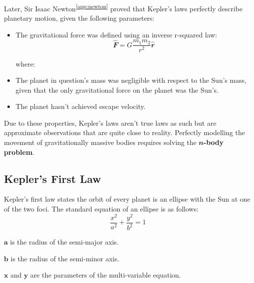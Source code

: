 \documentclass[12pt]{article}
\newcommand{\sref}[1]{\textsuperscript{\ref{#1}}}
\begin{document}
\begin{spacing}{1.25}
\par {
    Later, Sir Isaac Newton\sref{app:newton} proved that Kepler’s laws perfectly describe planetary motion, given the following parameters:
    \begin{itemize}
        \item The gravitational force was defined using an inverse r-squared law:
        \begin{equation}
            \mathbfit{\hat{F}} = G\frac{m_1m_2}{r^2} \mathbfit{\hat{r}}
        \end{equation}

        where:
        
        \item The planet in question's mass was negligible with respect to the Sun's mass, given that the only gravitational force on the planet was the Sun's.
        
        \item The planet hasn't achieved escape velocity.
    \end{itemize}
    \noindent Due to these properties, Kepler's laws aren't true laws as such but are approximate observations that are quite close to reality. Perfectly modelling the movement of gravitationally massive bodies requires solving the \(\mathbfit{n}\)\textbf{-body problem}.
}







\subsection{Kepler's First Law}
\par {
    Kepler's first law states the orbit of every planet is an ellipse with the Sun at one of the two foci. The standard equation of an ellipse is as follows: 
    \begin{equation*}
        \frac{x^2}{a^2} + \frac{y^2}{b^2} = 1
    \end{equation*}
    \begin{slist}
        \item \(\mathbf{a}\) is the radius of the semi-major axis.
        \item \(\mathbf{b}\) is the radius of the semi-minor axis.
        \item \(\mathbf{x}\) and \(\mathbf{y}\) are the parameters of the multi-variable equation.
    \end{slist}

}
\end{spacing}
\end{document}
